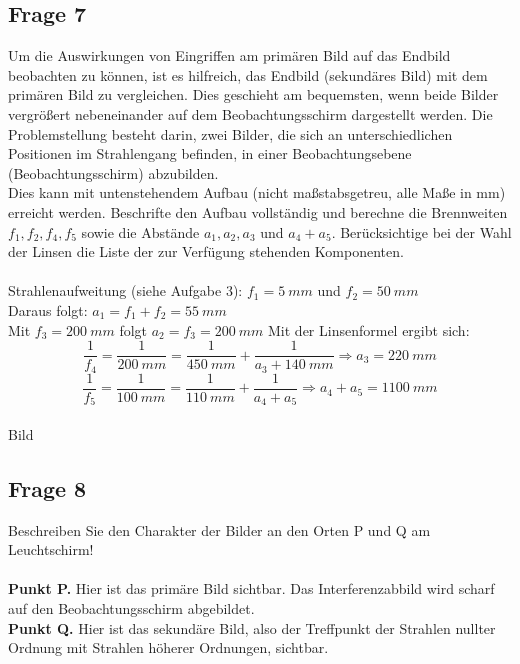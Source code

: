 \documentclass[a4paper,10pt]{scrartcl}
\begin{document}
	\subsection{Frage 7}
		Um die Auswirkungen von Eingriffen am primären Bild auf das Endbild beobachten zu können, ist es hilfreich, das Endbild (sekundäres Bild) mit dem primären Bild zu vergleichen. Dies geschieht am bequemsten, wenn beide Bilder vergrößert nebeneinander auf dem Beobachtungsschirm dargestellt werden. Die Problemstellung besteht darin, zwei Bilder, die sich an unterschiedlichen Positionen im Strahlengang befinden, in einer Beobachtungsebene (Beobachtungsschirm) abzubilden.\\
		Dies kann mit untenstehendem Aufbau (nicht maßstabsgetreu, alle Maße in mm) erreicht werden. Beschrifte den Aufbau vollständig und berechne die Brennweiten $f_1, f_2, f_4, f_5$ sowie die Abstände $a_1, a_2, a_3$ und $a_4 + a_5$. Berücksichtige bei der Wahl der Linsen die Liste der zur Verfügung stehenden Komponenten.
		\\
		\\
		Strahlenaufweitung (siehe Aufgabe 3): $f_1 = \SI{5}{mm}$ und $f_2 = \SI{50}{mm}$\\
		Daraus folgt: $a_1 = f_1 + f_2 = \SI{55}{mm}$\\
		Mit $f_3 = \SI{200}{mm}$ folgt $a_2 = f_3 = \SI{200}{mm}$
		Mit der Linsenformel ergibt sich:
			\[\frac{1}{f_4} = \frac{1}{\SI{200}{mm}} = \frac{1}{\SI{450}{mm}} + \frac{1}{a_3 + \SI{140}{mm}} \Rightarrow a_3 = \SI{220}{mm}\]
			\[\frac{1}{f_5} = \frac{1}{\SI{100}{mm}} = \frac{1}{\SI{110}{mm}} + \frac{1}{a_4 + a_5} \Rightarrow a_4 + a_5 = \SI{1100}{mm}\]
		\\
		Bild
		\\
	
	\subsection{Frage 8}
		Beschreiben Sie den Charakter der Bilder an den Orten P und Q am Leuchtschirm!
		\\
		\\
		\textbf{Punkt P.} Hier ist das primäre Bild sichtbar. Das Interferenzabbild wird scharf auf den Beobachtungsschirm abgebildet.\\
		\textbf{Punkt Q.} Hier ist das sekundäre Bild, also der Treffpunkt der Strahlen nullter Ordnung mit Strahlen höherer Ordnungen, sichtbar.
\end{document}
